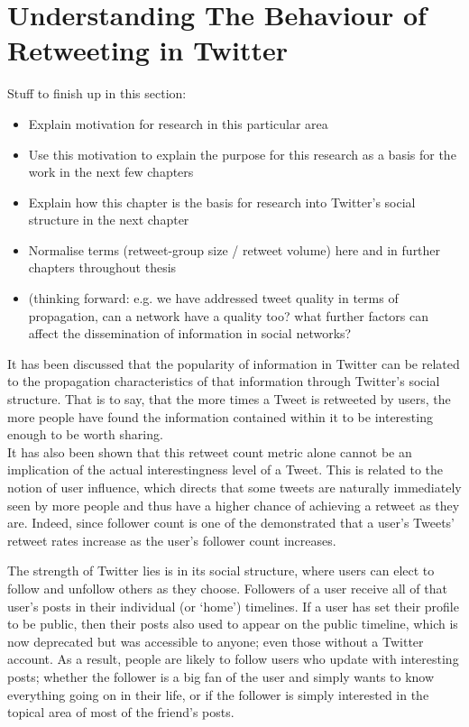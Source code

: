 \chapter{Understanding The Behaviour of Retweeting in Twitter}


Stuff to finish up in this section:
\begin{itemize}
\item Explain motivation for research in this particular area
\item Use this motivation to explain the purpose for this research as a basis for the work in the next few chapters
\item Explain how this chapter is the basis for research into Twitter's social structure in the next chapter
\item Normalise terms (retweet-group size / retweet volume) here and in further chapters throughout thesis
\item (thinking forward: e.g. we have addressed tweet quality in terms of propagation, can a network have a quality too? what further factors can affect the dissemination of information in social networks?
\end{itemize}

It has been discussed that the popularity of information in Twitter can be related to the propagation characteristics of that information through Twitter's social structure. That is to say, that the more times a Tweet is retweeted by users, the more people have found the information contained within it to be interesting enough to be worth sharing.\\
It has also been shown that this retweet count metric alone cannot be an implication of the actual interestingness level of a Tweet. This is related to the notion of user influence, which directs that some tweets are naturally immediately seen by more people and thus have a higher chance of achieving a retweet as they are. Indeed, since follower count is one of the \cite{suh10} demonstrated that a user's Tweets' retweet rates increase as the user's follower count increases.

The strength of Twitter lies is in its social structure, where users can elect to follow and unfollow others as they choose. Followers of a user receive all of that user's posts in their individual (or `home') timelines. If a user has set their profile to be public, then their posts also used to appear on the public timeline, which is now deprecated but was accessible to anyone; even those without a Twitter account. As a result, people are likely to follow users who update with interesting posts; whether the follower is a big fan of the user and simply wants to know everything going on in their life, or if the follower is simply interested in the topical area of most of the friend's posts. 

